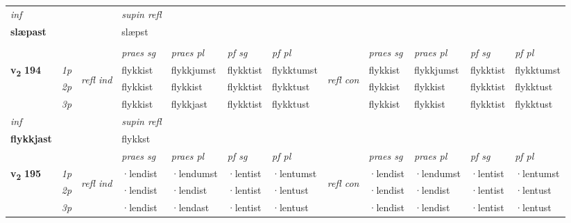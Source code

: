 \begin{longtable}[l]{X>{\footnotesize\itshape}llXXXXlXXXX}
   {\textit{inf}} & &       & \textit{supin refl}  \\*
  {\textbf{slæpast}} & &       & slæpst  \\*

\midrule
  & \\
   \midrule
 & &   & \textit{praes sg}  & \textit{praes pl}    & \textit{ pf sg} & \textit{pf pl} & & \textit{praes sg}  & \textit{praes pl}    & \textit{pf sg} & \textit{pf pl }  \\ \cmidrule{4-7} \cmidrule{9-12}
 \multirow{2}{*}{{{\textbf{v{\textsubscript{2}}} \Large{\textbf{194}}}}}  & 1p & \multirow{3}{*}{\begin{turn}{90}\textit{refl ind}\end{turn}}  & flykkist & flykkjumst & flykktist & flykktumst & \multirow{3}{*}{\begin{turn}{90}\textit{refl con}\end{turn}}  &flykkist & flykkjumst & flykktist & flykktumst \\*
 & 2p &  & flykkist & flykkist & flykktist & flykktust & &flykkist & flykkist & flykktist & flykktust \\*
 & 3p  & & flykkist & flykkjast & flykktist & flykktust & & flykkist & flykkist& flykktist & flykktust \\*
\cmidrule{4-7} \cmidrule{9-12}

   {\textit{inf}} & &       & \textit{supin refl}  \\*
  {\textbf{flykkjast}} & &       & flykkst  \\*

\midrule

 & &   & \textit{praes sg}  & \textit{praes pl}    & \textit{ pf sg} & \textit{pf pl} & & \textit{praes sg}  & \textit{praes pl}    & \textit{pf sg} & \textit{pf pl }  \\ \cmidrule{4-7} \cmidrule{9-12}
 \multirow{2}{*}{{{\textbf{v{\textsubscript{2}}} \Large{\textbf{195}}}}}  & 1p & \multirow{3}{*}{\begin{turn}{90}\textit{refl ind}\end{turn}}  & ·lendist & ·lendumst & ·lentist & ·lentumst & \multirow{3}{*}{\begin{turn}{90}\textit{refl con}\end{turn}}  &·lendist & ·lendumst & ·lentist & ·lentumst \\*
 & 2p &  & ·lendist & ·lendist & ·lentist & ·lentust & &·lendist & ·lendist & ·lentist & ·lentust \\*
 & 3p  & & ·lendist & ·lendast & ·lentist & ·lentust & & ·lendist & ·lendist& ·lentist & ·lentust \\*
\cmidrule{4-7} \cmidrule{9-12}


\end{longtable}
